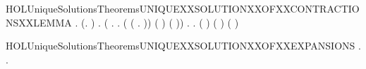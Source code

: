 \begin{SaveVerbatim}{HOLUniqueSolutionsTheoremsUNIQUEXXSOLUTIONXXOFXXCONTRACTIONSXXLEMMA}
\HOLTokenTurnstile{} \HOLSymConst{\HOLTokenForall{}} .
       (\HOLSymConst{\HOLTokenExists{}}.   \HOLSymConst{\HOLTokenConj{}}     \HOLSymConst{\HOLTokenConj{}}    ) \HOLSymConst{\HOLTokenImp{}}
       \HOLSymConst{\HOLTokenForall{}}.
             \HOLSymConst{\HOLTokenImp{}}
           (\HOLSymConst{\HOLTokenForall{}} .
                  \HOLTokenWeakTransBegin{} \HOLTokenWeakTransEnd {} \HOLSymConst{\HOLTokenImp{}}
                \HOLSymConst{\HOLTokenExists{}}.
                      \HOLSymConst{\HOLTokenConj{}}     \HOLSymConst{\HOLTokenConj{}}
                    (  (\HOLTokenLambda{} .  \HOLTokenWeakTransBegin{} \HOLTokenWeakTransEnd {})) ( )
                      ( )) \HOLSymConst{\HOLTokenConj{}}
           \HOLSymConst{\HOLTokenForall{}}.
                 \HOLTokenWeakTransBegin\HOLConst{\ensuremath{\tau}}\HOLTokenWeakTransEnd {} \HOLSymConst{\HOLTokenImp{}}
               \HOLSymConst{\HOLTokenExists{}}.
                     \HOLSymConst{\HOLTokenConj{}}     \HOLSymConst{\HOLTokenConj{}}
                   (  ) ( ) ( )
\end{SaveVerbatim}
\newcommand{\HOLUniqueSolutionsTheoremsUNIQUEXXSOLUTIONXXOFXXCONTRACTIONSXXLEMMA}{\UseVerbatim{HOLUniqueSolutionsTheoremsUNIQUEXXSOLUTIONXXOFXXCONTRACTIONSXXLEMMA}}
\begin{SaveVerbatim}{HOLUniqueSolutionsTheoremsUNIQUEXXSOLUTIONXXOFXXEXPANSIONS}
\HOLTokenTurnstile{} \HOLSymConst{\HOLTokenForall{}}.
         \HOLSymConst{\HOLTokenImp{}}
       \HOLSymConst{\HOLTokenForall{}} .     \HOLSymConst{\HOLTokenConj{}}     \HOLSymConst{\HOLTokenImp{}}   
\end{SaveVerbatim}
